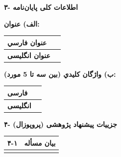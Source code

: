 \documentclass[12pt,a4paper]{article}
\newlength{\fullcolwidth}
\newlength{\labelcolwidth}
\newlength{\valcolwidth}
\newlength{\secnumwidth}
\newlength{\secbodywidth}
\newcommand{\sectiontable}[3]{%
  \noindent
  \begin{tabular}{|>{\centering\arraybackslash\bfseries\lotus}m{\secnumwidth}|m{\secbodywidth}|}
  \hline
  \rowcolor{graybg}
  #1 & {\textbf{\lotus #2}} \\
  \hline
  \multicolumn{2}{|p{\fullcolwidth}|}{%
    \vspace{4pt}
    #3
    \vspace{6pt}
  } \\
  \hline
  \end{tabular}
  \vspace{0.45cm}
}
\begin{document}
\newpage

\noindent\textbf{\lotus\large ۳- اطلاعات کلی پايان‌نامه}
\vspace{0.2cm}

\noindent\textbf{الف) عنوان:}

\vspace{0.2cm}

\noindent
\begin{tabular}{|>{\centering\arraybackslash}p{}|p{\valcolwidth}|}
\hline
\rowcolor{graybg}
\textbf{عنوان فارسي} & \\[1.2cm]
\hline
\rowcolor{graybg}
\textbf{عنوان انگلیسی} & \\[1.2cm]
\hline
\end{tabular}

\vspace{0.5cm}

\noindent\textbf{ب) واژگان كليدي (بین سه تا 5 مورد):}

\vspace{0.2cm}

\noindent
\begin{tabular}{|>{\centering\arraybackslash}p{}|p{\valcolwidth}|}
\hline
\rowcolor{graybg}
\textbf{فارسی} & \\[0.9cm]
\hline
\rowcolor{graybg}
\textbf{انگلیسی} & \\[0.9cm]
\hline
\end{tabular}

\newpage

\noindent\textbf{\lotus\large ۴- جزییات پیشنهاد پژوهشی (پروپوزال)}
\vspace{0.2cm}

\sectiontable{۴-۱}{بیان مسأله}{%
در بیان مسئله، نشان دهید که پژوهش شما ارزش توجه و مطالعه دارد. از این‌رو، باید تبیین کنید که از میان مطالعات و اقدامات پیشین، چه چیزی مورد غفلت یا کم‌توجهی واقع شده است. می‌توانید پاسخ به پرسش‌های زیر را مبنایی برای ساختار بیان مسئله قرار دهید:

چه کسانی از این مسئله رنج می‌برند؟ این مسئله در کدام موقعیت یا در چه مرحله‌ای رخ داده است؟ (به عنوان مثال، مسئله x در مرحله تحلیل نرم‌افزار رخ داده است). چه زمانی این مسئله رخ داده است؟ (به عنوان مثال، در سال‌های اخیر ... از زمان ظهور فناوری x ... ). چرا این مسئله رخ داده است؟ راه‌حل‌های پیشنهادی کنونی چه نقاط ضعفی داشته‌اند؟ این پژوهش به چه جنبه‌ای از کار خواهد پرداخت که در کارهای دیگر موجود نیست؟
}
\end{document}
